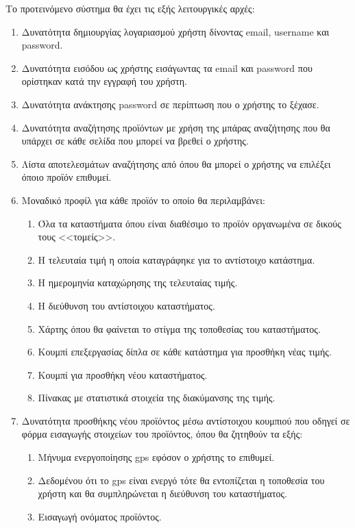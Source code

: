 \documentclass[12pt, oneside, a4paper]{report}
\begin{document}
\hspace{0.6cm}Το προτεινόμενο σύστημα θα έχει τις εξής λειτουργικές αρχές:
\newline
\begin{enumerate}
 \item Δυνατότητα δημιουργίας λογαριασμού χρήστη δίνοντας email, username και password.
 \item Δυνατότητα εισόδου ως χρήστης εισάγωντας τα email και password που ορίστηκαν κατά την εγγραφή του χρήστη.
 \item Δυνατότητα ανάκτησης password σε περίπτωση που ο χρήστης το ξέχασε.
 \item Δυνατότητα αναζήτησης προϊόντων με χρήση της μπάρας αναζήτησης που θα υπάρχει σε κάθε σελίδα που μπορεί να βρεθεί ο χρήστης.
 \item Λίστα αποτελεσμάτων αναζήτησης από όπου θα μπορεί ο χρήστης να επιλέξει όποιο προϊόν επιθυμεί.
 \item Μοναδικό προφίλ για κάθε προϊόν το οποίο θα περιλαμβάνει:
    \begin{enumerate}
     \item Όλα τα καταστήματα όπου είναι διαθέσιμο το προϊόν οργανωμένα σε δικούς τους <<τομείς>>.
     \item Η τελευταία τιμή η οποία καταγράφηκε για το αντίστοιχο κατάστημα.
     \item Η ημερομηνία καταχώρησης της τελευταίας τιμής.
     \item Η διεύθυνση του αντίστοιχου καταστήματος.
     \item Χάρτης όπου θα φαίνεται το στίγμα της τοποθεσίας του καταστήματος.
     \item Κουμπί επεξεργασίας δίπλα σε κάθε κατάστημα για προσθήκη νέας τιμής.
     \item Κουμπί για προσθήκη νέου καταστήματος.
     \item Πίνακας με στατιστικά στοιχεία της διακύμανσης της τιμής.
    \end{enumerate}
\item Δυνατότητα προσθήκης νέου προϊόντος μέσω αντίστοιχου κουμπιού που οδηγεί σε φόρμα εισαγωγής στοιχείων του προϊόντος, όπου θα ζητηθούν τα εξής:
    \begin{enumerate}
     \item Μήνυμα ενεργοποίησης gps εφόσον ο χρήστης το επιθυμεί.
     \item Δεδομένου ότι το gps είναι ενεργό τότε θα εντοπίζεται η τοποθεσία του χρήστη και θα συμπληρώνεται η διεύθυνση του καταστήματος.
     \item Εισαγωγή ονόματος προϊόντος.

\end{enumerate}
\end{enumerate}
\end{document}
